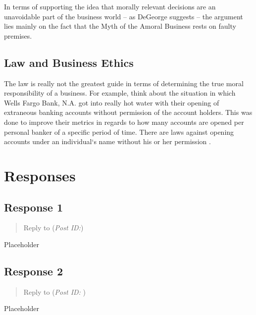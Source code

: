 \documentclass[12pt]{article}
\theoremstyle{definition}
\theoremstyle{plain}
\begin{document}
      In terms of supporting the idea that morally relevant decisions are an unavoidable part
        of the business world -- as DeGeorge suggests -- the argument lies mainly on the fact that
        the Myth of the Amoral Business rests on faulty premises.
        
      \subsection{Law and Business Ethics}
        The law is really not the greatest guide in terms of determining the true moral
          responsibility of a business. For example, think about the situation in which
          Wells Fargo Bank, N.A. got into really hot water with their opening of extraneous
          banking accounts without permission of the account holders. This was done to
          improve their metrics in regards to how many accounts are opened per personal
          banker of a specific period of time. There are laws against opening accounts
          under an individual`s name without his or her permission \autocite{mclean_2017}.
    \newpage
  \section{Responses}

    \subsection{Response 1}
      \begin{quote}
        Reply to \textbf{} (\textit{Post ID:})
      \end{quote}
      Placeholder

    \subsection{Response 2}
      \begin{quote}
        Reply to \textbf{} (\textit{Post ID: }) 
      \end{quote}
      Placeholder

  \newpage
  \printbibliography[
    heading=bibintoc,
    title={Works Cited}
  ]
\end{document}
